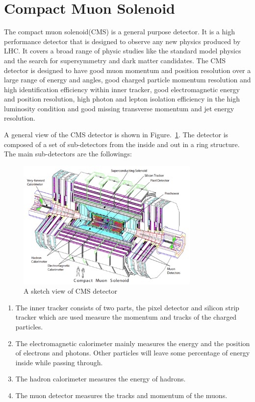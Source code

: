 \section{Compact Muon Solenoid}
The compact muon solenoid(CMS) is a general purpose detector. It is a high performance detector that is designed to observe any new physics produced by LHC. It covers a broad range of physic studies like the standard model physics and the search for supersymmetry and dark matter candidates. The CMS detector is designed to have good muon momentum and position resolution over a large range of energy and angles, good charged particle momentum resolution and high identification efficiency within inner tracker, good electromagnetic energy and position resolution, high photon and lepton isolation efficiency in the high luminosity condition and good missing transverse momentum and jet energy resolution.  


A general view of the CMS detector is shown in Figure.~\ref{fig:CMS_sketch}. The detector is composed of a set of sub-detectors from the inside and out in a ring structure. The main sub-detectors are the followings:

\begin{figure}[htbp] 
\centering
\includegraphics[width=0.8\textwidth]{chapter3/CMS_detecter.png}
\caption{A sketch view of CMS detector~\cite{CMS_experiment}}
\label{fig:CMS_sketch}
\end{figure}


\begin{enumerate}[$\bullet$]
\item The inner tracker consists of two parts, the pixel detector and silicon strip tracker which are used measure the momentum and tracks of the charged particles.
\item The electromagnetic calorimeter mainly measures the energy and the position of electrons and photons. Other particles will leave some percentage of energy inside while passing through.
\item The hadron calorimeter measures the energy of hadrons. 
\item The muon detector measures the tracks and momentum of the muons.
\end{enumerate} 

